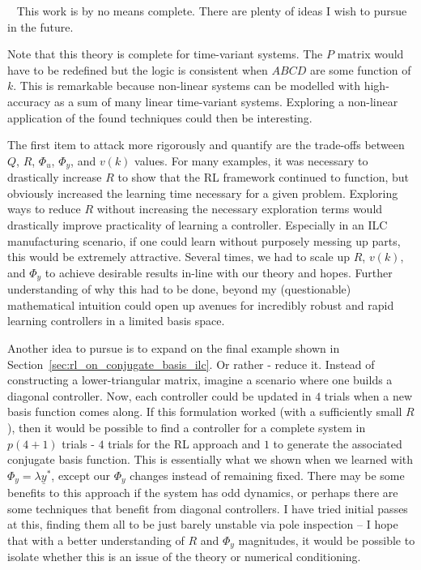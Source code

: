 ~\label{sec:future_work}
This work is by no means complete. There are plenty of ideas I wish to pursue in the future.

Note that this theory is complete for time-variant systems. The $P$ matrix would have to be redefined but the logic is consistent when $ABCD$ are some function of $k$. This is remarkable because non-linear systems can be modelled with high-accuracy as a sum of many linear time-variant systems. Exploring a non-linear application of the found techniques could then be interesting.

The first item to attack more rigorously and quantify are the trade-offs between $Q$, $R$, $\Phi_u$, $\Phi_y$, and $v(k)$ values. For many examples, it was necessary to drastically increase $R$ to show that the RL framework continued to function, but obviously increased the learning time necessary for a given problem. Exploring ways to reduce $R$ without increasing the necessary exploration terms would drastically improve practicality of learning a controller. Especially in an ILC manufacturing scenario, if one could learn without purposely messing up parts, this would be extremely attractive. Several times, we had to scale up $R$, $v(k)$, and $\Phi_y$ to achieve desirable results in-line with our theory and hopes. Further understanding of why this had to be done, beyond my (questionable) mathematical intuition could open up avenues for incredibly robust and rapid learning controllers in a limited basis space.

Another idea to pursue is to expand on the final example shown in Section~\ref{sec:rl_on_conjugate_basis_ilc}. 
Or rather - reduce it. Instead of constructing a lower-triangular matrix, imagine a scenario where one builds a diagonal controller. Now, each controller could be updated in $4$ trials when a new basis function comes along. If this formulation worked (with a sufficiently small $R$), then it would be possible to find a controller for a complete system in $p(4 + 1)$ trials - $4$ trials for the RL approach and $1$ to generate the associated conjugate basis function. This is essentially what we shown when we learned with $\Phi_y = \lambda \underline{y}^\ast$, except our $\Phi_y$ changes instead of remaining fixed. There may be some benefits to this approach if the system has odd dynamics, or perhaps there are some techniques that benefit from diagonal controllers. I have tried initial passes at this, finding them all to be just barely unstable via pole inspection -- I hope that with a better understanding of $R$ and $\Phi_y$ magnitudes, it would be possible to isolate whether this is an issue of the theory or numerical conditioning.

